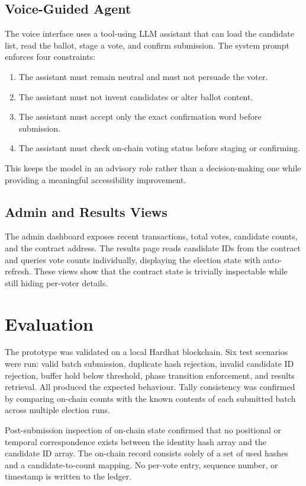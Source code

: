 \documentclass{ieeeaccess}
\begin{document}
\subsection{Voice-Guided Agent}
The voice interface uses a tool-using LLM assistant that can load the candidate list, read the ballot, stage a vote, and confirm submission. The system prompt enforces four constraints:
\begin{enumerate}
    \item The assistant must remain neutral and must not persuade the voter.
    \item The assistant must not invent candidates or alter ballot content.
    \item The assistant must accept only the exact confirmation word before submission.
    \item The assistant must check on-chain voting status before staging or confirming.
\end{enumerate}
This keeps the model in an advisory role rather than a decision-making one while providing a meaningful accessibility improvement.

\subsection{Admin and Results Views}
The admin dashboard exposes recent transactions, total votes, candidate counts, and the contract address. The results page reads candidate IDs from the contract and queries vote counts individually, displaying the election state with auto-refresh. These views show that the contract state is trivially inspectable while still hiding per-voter details.

\section{Evaluation}
The prototype was validated on a local Hardhat blockchain. Six test scenarios were run: valid batch submission, duplicate hash rejection, invalid candidate ID rejection, buffer hold below threshold, phase transition enforcement, and results retrieval. All produced the expected behaviour. Tally consistency was confirmed by comparing on-chain counts with the known contents of each submitted batch across multiple election runs.

Post-submission inspection of on-chain state confirmed that no positional or temporal correspondence exists between the identity hash array and the candidate ID array. The on-chain record consists solely of a set of used hashes and a candidate-to-count mapping. No per-vote entry, sequence number, or timestamp is written to the ledger.
\end{document}
